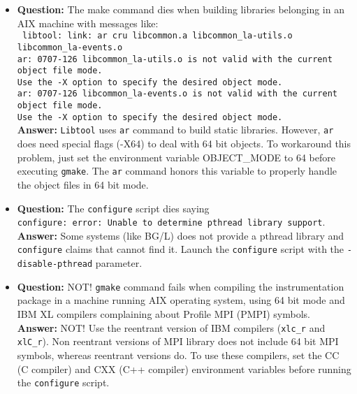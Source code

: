 \begin{itemize}
\item {\bf Question:} The make command dies when building libraries belonging \TRACE in an AIX machine with messages like:\\
      {\tt
      libtool: link: ar cru libcommon.a libcommon\_la-utils.o libcommon\_la-events.o\\
      ar: 0707-126 libcommon\_la-utils.o is not valid with the current object file mode.\\
              Use the -X option to specify the desired object mode.\\
      ar: 0707-126 libcommon\_la-events.o is not valid with the current object file mode.\\
              Use the -X option to specify the desired object mode.\\
      }
      {\bf Answer:  } {\tt Libtool} uses {\tt ar} command to build static libraries. However, {\tt ar} does need special flags (-X64) to deal with 64 bit objects. To workaround this problem, just set the environment variable OBJECT\_MODE to 64 before executing {\tt gmake}. The {\tt ar} command honors this variable to properly handle the object files in 64 bit mode.

\item {\bf Question:} The {\tt configure} script dies saying\\
      {\tt configure: error: Unable to determine pthread library support}.\\
      {\bf Answer:  } Some systems (like BG/L) does not provide a pthread library and {\tt configure} claims that cannot find it. Launch the {\tt configure} script with the {\tt -disable-pthread} parameter.

\item {\bf Question:} {NOT!} {\tt gmake} command fails when compiling the instrumentation package in a machine running AIX operating system, using 64 bit mode and IBM XL compilers complaining about Profile MPI (PMPI) symbols.\\
      {\bf Answer:  } {NOT!} Use the reentrant version of IBM compilers ({\tt xlc\_r} and {\tt xlC\_r}). Non reentrant versions of MPI library does not include 64 bit MPI symbols, whereas reentrant versions do. To use these compilers, set the CC (C compiler) and CXX (C++ compiler) environment variables before running the {\tt configure} script.


\end{itemize}
